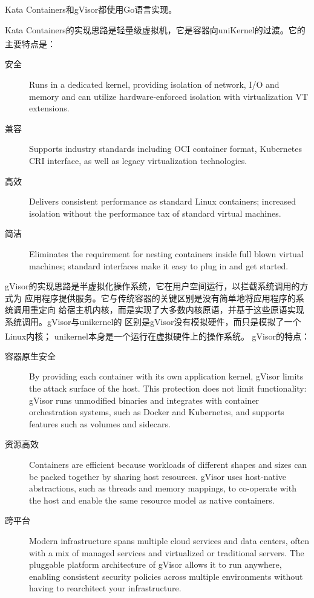 \documentclass[UTF8,fontset=none,linespread=1.15]{ctexart}
\let\nosupcite\cite
\renewcommand*{\cite}[1]{\textsuperscript{\nosupcite{#1}}}
\begin{document}
Kata Containers和gVisor都使用Go语言实现。

Kata Containers的实现思路是轻量级虚拟机，它是容器向uniKernel的过渡。它的主要特点是\cite{bib:kata}：
\begin{description}
\item[安全] Runs in a dedicated kernel, providing isolation of network,
I/O and memory and can utilize hardware-enforced isolation with virtualization VT extensions.
\item[兼容] Supports industry standards including OCI container format,
Kubernetes CRI interface, as well as legacy virtualization technologies.
\item[高效] Delivers consistent performance as standard Linux containers;
increased isolation without the performance tax of standard virtual machines.
\item[简洁] Eliminates the requirement for nesting containers inside full
blown virtual machines; standard interfaces make it easy to plug in and get started.
\end{description}

gVisor的实现思路是半虚拟化操作系统，它在用户空间运行，以拦截系统调用的方式为
应用程序提供服务。它与传统容器的关键区别是没有简单地将应用程序的系统调用重定向
给宿主机内核，而是实现了大多数内核原语，并基于这些原语实现系统调用。gVisor与unikernel的
区别是gVisor没有模拟硬件，而只是模拟了一个Linux内核；
unikernel本身是一个运行在虚拟硬件上的操作系统。
gVisor的特点：\cite{bib:gvisor}
\begin{description}
\item[容器原生安全] By providing each container with its own application kernel, gVisor limits the attack surface of the host. This protection does not limit functionality: gVisor runs unmodified binaries and integrates with container orchestration systems, such as Docker and Kubernetes, and supports features such as volumes and sidecars.

\item[资源高效] Containers are efficient because workloads of different shapes and sizes can be packed together by sharing host resources. gVisor uses host-native abstractions, such as threads and memory mappings, to co-operate with the host and enable the same resource model as native containers.

\item[跨平台] Modern infrastructure spans multiple cloud services and data centers, often with a mix of managed services and virtualized or traditional servers. The pluggable platform architecture of gVisor allows it to run anywhere, enabling consistent security policies across multiple environments without having to rearchitect your infrastructure.
\end{description}
\end{document}
